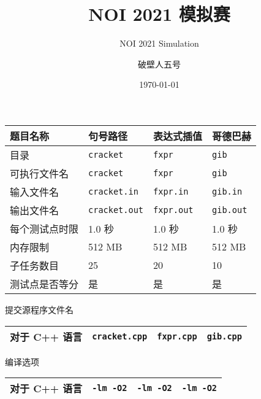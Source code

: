 \documentclass{statement}
\title{NOI 2021 模拟赛}
\subtitle{NOI 2021 Simulation}
\author{破壁人五号}
\date{\today}
\begin{document}
    \begin{titlingpage}
        \maketitle
        \begin{center}
        \begin{tabularx}{\textwidth}{|X|X|X|X|}
        \hline
            题目名称 & 句号路径 & 表达式插值 & 哥德巴赫\\
        \hline
            目录 & \texttt{cracket} & \texttt{fxpr} & \texttt{gib}\\
        \hline
            可执行文件名 & \texttt{cracket} & \texttt{fxpr} & \texttt{gib}\\
        \hline
            输入文件名 & \texttt{cracket.in} & \texttt{fxpr.in} & \texttt{gib.in}\\
        \hline
            输出文件名 & \texttt{cracket.out} & \texttt{fxpr.out} & \texttt{gib.out}\\
        \hline
            每个测试点时限 & 1.0 秒 & 1.0 秒 & 1.0 秒\\
        \hline
            内存限制 & 512 MB & 512 MB & 512 MB\\
        \hline
            子任务数目 & 25 & 20 & 10\\
        \hline
            测试点是否等分 & 是 & 是 & 是\\
        \hline
        \end{tabularx}\par
        \end{center}
        
        提交源程序文件名
        \begin{center}
        \begin{tabularx}{\textwidth}{|X|X|X|X|}
        \hline
            对于 C++ 语言 & \texttt{cracket.cpp} & \texttt{fxpr.cpp} & \texttt{gib.cpp}\\
        \hline
        \end{tabularx}\par
        \end{center}
        
        编译选项
        \begin{center}
        \begin{tabularx}{\textwidth}{|X|X|X|X|}
        \hline
            对于 C++ 语言 & \texttt{-lm -O2} & \texttt{-lm -O2} & \texttt{-lm -O2}\\
        \hline
        \end{tabularx}\par
        \end{center}


\end{titlingpage}
\end{document}
